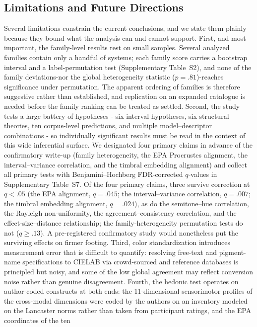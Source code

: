 \documentclass[12pt]{article}
\begin{document}
\subsection{Limitations and Future Directions}

Several limitations constrain the current conclusions, and we state
them plainly because they bound what the analysis can and cannot
support. First, and most important, the family-level results rest on
small samples. Several analyzed families contain only a handful of
systems; each family score carries a
bootstrap interval and a label-permutation test (Supplementary
Table~S2), and none of the family deviations-nor the global
heterogeneity statistic ($p = .81$)-reaches significance under
permutation. The apparent ordering of
families is therefore suggestive rather than established, and
replication on an expanded catalogue is needed before the family
ranking can be treated as settled. Second, the study tests a
large battery of hypotheses - six interval hypotheses, six structural
theories, ten corpus-level predictions, and multiple model--descriptor
combinations - so individually significant results must be read in the
context of this wide inferential surface. We designated four primary
claims in advance of the confirmatory write-up (family heterogeneity,
the EPA Procrustes alignment, the interval--variance correlation, and
the timbral embedding alignment) and collect all primary tests with
Benjamini--Hochberg FDR-corrected $q$-values in Supplementary
Table~S7. Of the four primary claims, three survive correction at
$q < .05$ (the EPA alignment, $q = .045$; the interval--variance
correlation, $q = .007$; the timbral embedding alignment, $q = .024$),
as do the semitone--hue correlation, the Rayleigh non-uniformity, the
agreement--consistency correlation, and the effect-size--distance
relationship; the family-heterogeneity permutation tests do not
($q \ge .13$).
A pre-registered confirmatory study would nonetheless put the
surviving effects on firmer footing. Third, color
standardization introduces measurement error that is difficult to
quantify: resolving free-text and pigment-name specifications to CIELAB
via crowd-sourced and reference databases is principled but noisy, and
some of the low global agreement may reflect conversion noise rather
than genuine disagreement. Fourth, the hedonic test operates on
author-coded constructs at both ends: the 11-dimensional
sensorimotor profiles of the cross-modal dimensions were coded by the
authors on an inventory modeled on the Lancaster norms rather than
taken from participant ratings, and the EPA coordinates of the ten
\end{document}
